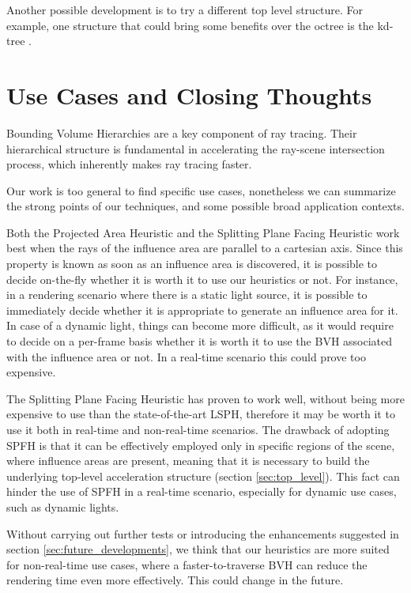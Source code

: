 \documentclass[acmtog, anonymous, review]{acmart}
\begin{document}
Another possible development is to try a different top level structure. For example, one structure that could bring some benefits over the octree is the kd-tree \cite{kd_trees}.

\section{Use Cases and Closing Thoughts}
Bounding Volume Hierarchies are a key component of ray tracing. Their hierarchical structure is fundamental in accelerating the ray-scene intersection process, which inherently makes ray tracing faster.

Our work is too general to find specific use cases, nonetheless we can summarize the strong points of our techniques, and some possible broad application contexts.

Both the Projected Area Heuristic and the Splitting Plane Facing Heuristic work best when the rays of the influence area are parallel to a cartesian axis. Since this property is known as soon as an influence area is discovered, it is possible to decide on-the-fly whether it is worth it to use our heuristics or not. For instance, in a rendering scenario where there is a static light source, it is possible to immediately decide whether it is appropriate to generate an influence area for it. In case of a dynamic light, things can become more difficult, as it would require to decide on a per-frame basis whether it is worth it to use the BVH associated with the influence area or not. In a real-time scenario this could prove too expensive.

The Splitting Plane Facing Heuristic has proven to work well, without being more expensive to use  than the state-of-the-art LSPH, therefore it may be worth it to use it both in real-time and non-real-time scenarios. The drawback of adopting SPFH is that it can be effectively employed only in specific regions of the scene, where influence areas are present, meaning that it is necessary to build the underlying top-level acceleration structure (section \ref{sec:top_level}). This fact can hinder the use of SPFH in a real-time scenario, especially for dynamic use cases, such as dynamic lights.

Without carrying out further tests or introducing the enhancements suggested in section \ref{sec:future_developments}, we think that our heuristics are more suited for non-real-time use cases, where a faster-to-traverse BVH can reduce the rendering time even more effectively. This could change in the future.
\end{document}
